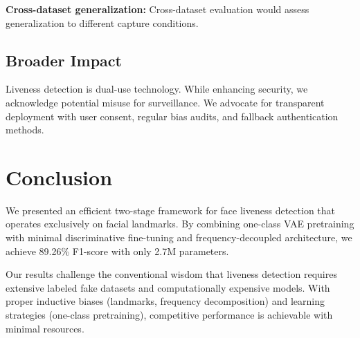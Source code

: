 \documentclass[11pt,twocolumn]{article}
\begin{document}
\textbf{Cross-dataset generalization:} Cross-dataset evaluation would assess generalization to different capture conditions.

\subsection{Broader Impact}

Liveness detection is dual-use technology. While enhancing security, we acknowledge potential misuse for surveillance. We advocate for transparent deployment with user consent, regular bias audits, and fallback authentication methods.

\section{Conclusion}

We presented an efficient two-stage framework for face liveness detection that operates exclusively on facial landmarks. By combining one-class VAE pretraining with minimal discriminative fine-tuning and frequency-decoupled architecture, we achieve 89.26\% F1-score with only 2.7M parameters.

Our results challenge the conventional wisdom that liveness detection requires extensive labeled fake datasets and computationally expensive models. With proper inductive biases (landmarks, frequency decomposition) and learning strategies (one-class pretraining), competitive performance is achievable with minimal resources.



\end{document}

